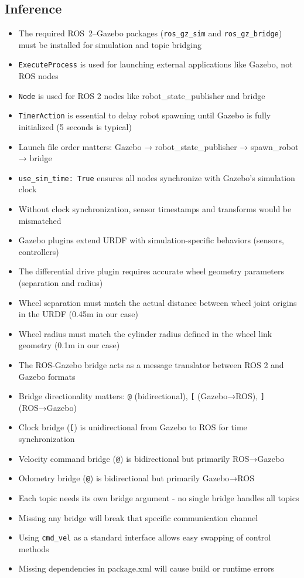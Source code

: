 \subsection{Inference}
\begin{itemize}
	\item The required ROS~2--Gazebo packages (\texttt{ros\_gz\_sim} and \texttt{ros\_gz\_bridge}) must be installed for simulation and topic bridging
	\item \texttt{ExecuteProcess} is used for launching external applications like Gazebo, not ROS nodes
	\item \texttt{Node} is used for ROS 2 nodes like robot\_state\_publisher and bridge
	\item \texttt{TimerAction} is essential to delay robot spawning until Gazebo is fully initialized (5 seconds is typical)
	\item Launch file order matters: Gazebo → robot\_state\_publisher → spawn\_robot → bridge
	\item \texttt{use\_sim\_time: True} ensures all nodes synchronize with Gazebo's simulation clock
	\item Without clock synchronization, sensor timestamps and transforms would be mismatched
	\item Gazebo plugins extend URDF with simulation-specific behaviors (sensors, controllers)
	\item The differential drive plugin requires accurate wheel geometry parameters (separation and radius)
	\item Wheel separation must match the actual distance between wheel joint origins in the URDF (0.45m in our case)
	\item Wheel radius must match the cylinder radius defined in the wheel link geometry (0.1m in our case)
	\item The ROS-Gazebo bridge acts as a message translator between ROS 2 and Gazebo formats
	\item Bridge directionality matters: \texttt{@} (bidirectional), \texttt{[} (Gazebo→ROS), \texttt{]} (ROS→Gazebo)
	\item Clock bridge (\texttt{[}) is unidirectional from Gazebo to ROS for time synchronization
	\item Velocity command bridge (\texttt{@}) is bidirectional but primarily ROS→Gazebo
	\item Odometry bridge (\texttt{@}) is bidirectional but primarily Gazebo→ROS
	\item Each topic needs its own bridge argument - no single bridge handles all topics
	\item Missing any bridge will break that specific communication channel
	\item Using \texttt{cmd\_vel} as a standard interface allows easy swapping of control methods
	\item Missing dependencies in package.xml will cause build or runtime errors
\end{itemize}

